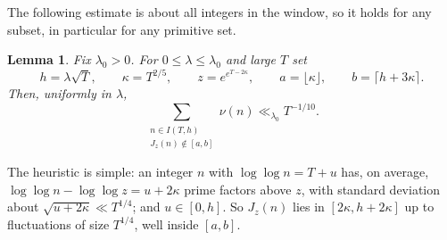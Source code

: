 \documentclass[11pt,a4paper]{article}
\numberwithin{equation}{section}
\theoremstyle{plain}
\newtheorem{lemma}[theorem]{Lemma}
\theoremstyle{definition}
\theoremstyle{remark}
\begin{document}
The following estimate is about all integers in the window, so it holds for any subset, in particular for any primitive set.

\begin{lemma}\label{lem:rank}
Fix $\lambda_0>0$. For $0\le\lambda\le\lambda_0$ and large $T$ set
\begin{equation}\label{eq:params}
h=\lambda\sqrt T,\qquad \kappa=T^{2/5},\qquad z=e^{e^{T-2\kappa}},\qquad a=\lfloor\kappa\rfloor,\qquad b=\lceil h+3\kappa\rceil.
\end{equation}
Then, uniformly in $\lambda$,
\begin{equation}\label{eq:rankbound}
\sum_{\substack{n\in I(T,h)\\ J_z(n)\notin[a,b]}}\nu(n)\ll_{\lambda_0}T^{-1/10}.
\end{equation}
\end{lemma}

The heuristic is simple: an integer $n$ with $\log\log n=T+u$ has, on average, $\log\log n-\log\log z=u+2\kappa$ prime factors above $z$, with standard deviation about $\sqrt{u+2\kappa}\ll T^{1/4}$; and $u\in[0,h]$. So $J_z(n)$ lies in $[2\kappa,h+2\kappa]$ up to fluctuations of size $T^{1/4}$, well inside $[a,b]$.
\end{document}

